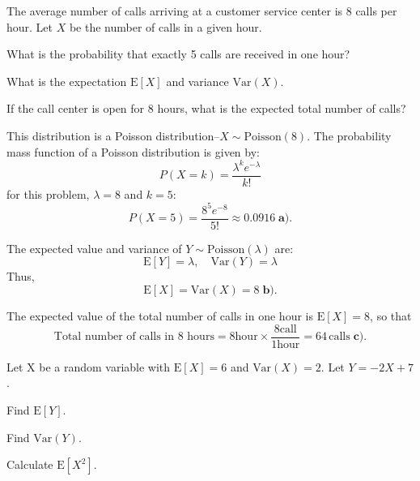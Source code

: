 \documentclass[a4paper, 10pt]{article}
\begin{document}
\pagebreak

\begin{problem}
The average number of calls arriving at a customer service center is 8 calls per hour.
Let \( X \) be the number of calls in a given hour.
\begin{subproblems_alpha}
	\item What is the probability that exactly 5 calls are received in one hour?
	\item What is the expectation \( \text{E}[X] \) and variance \( \text{Var}(X) \).
	\item If the call center is open for 8 hours, what is the expected total number of calls?
\end{subproblems_alpha}
\end{problem}

\begin{solution}
	This distribution is a Poisson distribution--\( X \sim \text{Poisson}(8) \).
	The probability mass function of a Poisson distribution is given by:
	\[
		P(X = k) = \frac{\lambda^k e^{-\lambda}}{k!}
	\]
	for this problem, \( \lambda = 8 \) and \( k = 5 \):
	\[
		P(X = 5) = \frac{8^5 e^{-8}}{5!} \approx \boxed{0.0916} \; \textbf{a).}
	\]

	The expected value and variance of \( Y \sim \text{Poisson}(\lambda) \) are:
	\[
		\text{E}[Y] = \lambda, \quad \text{Var}(Y) = \lambda
	\]
	Thus,
	\[
		\boxed{\text{E}[X] = \text{Var}(X) = 8} \; \textbf{b).}
	\]

	The expected value of the total number of calls in one hour is \( \text{E}[X] = 8 \), so that
	\[
		\text{Total number of calls in 8 hours} = 8 \text{hour} \times \frac{8 \text{call}}{1 \text{hour}} = \boxed{64 \, \text{calls}} \; \textbf{c).}
	\]
\end{solution}

\begin{problem}
Let X be a random variable with \( \text{E}[X] = 6 \) and \( \text{Var}(X) = 2 \).
Let \( Y = -2X + 7 \).
\begin{subproblems_alpha}
	\item Find \( \text{E}[Y] \).
	\item Find \( \text{Var}(Y) \).
	\item Calculate \( \text{E}[X^2] \).
\end{subproblems_alpha}
\end{problem}
\end{document}
